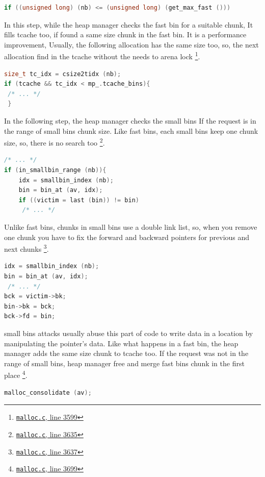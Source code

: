 \documentclass{masterthesis}
\newcommand*\tch{tcache}
\newcommand*\fb{fast bins}
\newcommand*\sbs{small bins}
\begin{document}
\begin{lstlisting}[language=c,frame=tlrb]
if ((unsigned long) (nb) <= (unsigned long) (get_max_fast ()))
\end{lstlisting}

In this step, while the heap manager checks the fast bin for a suitable chunk, It fills \tch{} too, if found a same size chunk in the fast bin. It is a performance improvement, Usually, the following allocation has the same size too, so, the next allocation find in the \tch{} without the needs to arena lock  \footnote{\href{https://sourceware.org/git/?p=glibc.git;a=blob;f=malloc/malloc.c;h=f7cd29bc2f93e1082ee77800bd64a4b2a2897055;hb=9ea3686266dca3f004ba874745a4087a89682617\#l3599}{\texttt{malloc.c}, line 3599}}.

\begin{lstlisting}[language=c,frame=tlrb]
size_t tc_idx = csize2tidx (nb);
if (tcache && tc_idx < mp_.tcache_bins){
 /* ... */ 
 }
\end{lstlisting}

In the following step, the heap manager checks the \sbs{} If the request is in the range of \sbs{} chunk size. Like \fb{}, each \sbs{} keep one chunk size, so, there is no search too \footnote{\href{https://sourceware.org/git/?p=glibc.git;a=blob;f=malloc/malloc.c;h=f7cd29bc2f93e1082ee77800bd64a4b2a2897055;hb=9ea3686266dca3f004ba874745a4087a89682617\#l3635}{\texttt{malloc.c}, line 3635}}.

\begin{lstlisting}[language=c,frame=tlrb]
 /* ... */ 
if (in_smallbin_range (nb)){
	idx = smallbin_index (nb);
	bin = bin_at (av, idx);
	if ((victim = last (bin)) != bin)
	 /* ... */ 
\end{lstlisting}

Unlike \fb{}, chunks in \sbs{} use a double link list, so, when you remove one chunk you have to fix the forward and backward pointers for previous and next chunks \footnote{\href{https://sourceware.org/git/?p=glibc.git;a=blob;f=malloc/malloc.c;h=f7cd29bc2f93e1082ee77800bd64a4b2a2897055;hb=9ea3686266dca3f004ba874745a4087a89682617\#l3637}{\texttt{malloc.c}, line 3637}}. 

\begin{lstlisting}[language=c,frame=tlrb]
idx = smallbin_index (nb);
bin = bin_at (av, idx);
 /* ... */ 
bck = victim->bk;
bin->bk = bck;
bck->fd = bin;
\end{lstlisting}

\sbs{} attacks usually abuse this part of code to write data in a location by manipulating the pointer's data. Like what happens in a fast bin, the heap manager adds the same size chunk to \tch{} too. If the request was not in the range of \sbs{}, heap manager free and merge \fb{} chunk in the first place \footnote{\href{https://sourceware.org/git/?p=glibc.git;a=blob;f=malloc/malloc.c;h=f7cd29bc2f93e1082ee77800bd64a4b2a2897055;hb=9ea3686266dca3f004ba874745a4087a89682617\#l3699}{\texttt{malloc.c}, line 3699}}.
\begin{lstlisting}[language=c,frame=tlrb]
malloc_consolidate (av);
\end{lstlisting}
\end{document}
